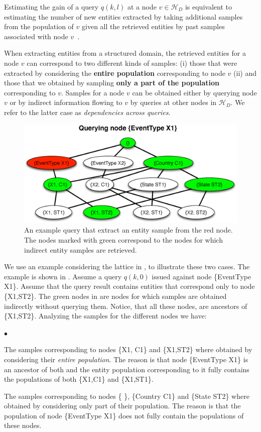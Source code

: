 \documentclass{vldb}
\newcommand{\squishlist}{
   \begin{list}{$\bullet$}
    {
      \setlength{\itemsep}{0pt}
      \setlength{\parsep}{3pt}
      \setlength{\topsep}{3pt}
      \setlength{\partopsep}{0pt}
      \setlength{\leftmargin}{1.5em}
      \setlength{\labelwidth}{1em}
      \setlength{\labelsep}{0.5em} } }
\newcommand{\squishend}{
    \end{list}  }
\newcommand{\hierarchy}{\mathcal{H}_D}
\begin{document}
Estimating the gain of a query $q(k,l)$ at a node $v \in \hierarchy$ is equivalent to estimating the number of new entities extracted by taking additional samples from the population of $v$ given all the retrieved entities by past samples associated with node $v$~\cite{trushkowsky:2013}. 

When extracting entities from a structured domain, the retrieved entities for a node $v$ can correspond to two different kinds of samples: (i) those that were extracted by considering the {\bf entire population} corresponding to node $v$ (ii) and those that we obtained by sampling {\bf only a part of the population} corresponding to $v$. Samples for a node $v$ can be obtained either by querying node $v$ or by indirect information flowing to $v$ by queries at other nodes in $\hierarchy$. We refer to the latter case as {\em dependencies across queries}. 
\begin{figure}[h]
	\begin{center}
	\includegraphics[clip,scale=0.32]{figs/exampleQuery.eps}
	\caption{An example query that extract an entity sample from the red node. The nodes marked with green correspond to the nodes for which indirect entity samples are retrieved.}
	\label{fig:query}
	\end{center}
	\vspace{-10pt}
\end{figure}

We use an example considering the lattice in , to illustrate these two cases. The example is shown in . Assume a query $q(k,0)$ issued against node \{EventType X1\}. Assume that the query result contains entities that correspond only to node \{X1,ST2\}. The green nodes in  are nodes for which samples are obtained indirectly without querying them. Notice, that all these nodes, are ancestors of \{X1,ST2\}. Analyzing the samples for the different nodes we have:
\squishlist
\item The samples corresponding to nodes \{X1, C1\} and \{X1,ST2\} where obtained by considering their {\em entire population}. The reason is that node \{EventType X1\} is an ancestor of both and the entity population corresponding to it fully contains the populations of both \{X1,C1\} and \{X1,ST1\}. 
\item The samples corresponding to nodes \{ \}, \{Country C1\} and \{State ST2\} where obtained by considering only part of their population. The reason is that the population of node \{EventType X1\} does not fully contain the populations of these nodes. 
\squishend
\end{document}

